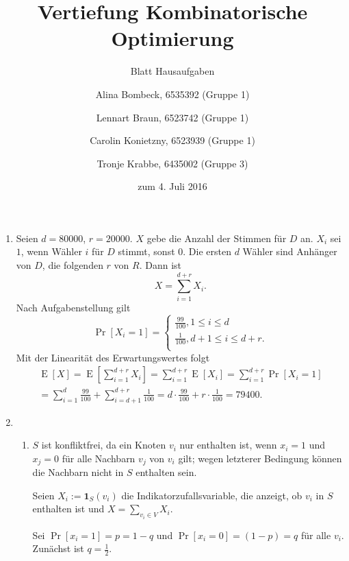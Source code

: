 \documentclass[a4paper]{scrartcl}
\title{Vertiefung Kombinatorische Optimierung}
\subtitle{Blatt {\blattnr} Hausaufgaben}
\author{%
    Alina Bombeck, 6535392 (Gruppe 1) \and
    Lennart Braun, 6523742 (Gruppe 1) \and
    Carolin Konietzny, 6523939 (Gruppe 1) \and
    Tronje Krabbe, 6435002 (Gruppe 3)
}
\date{zum 4. Juli 2016}
\DeclareMathOperator{\Pr}{Pr}
\DeclareMathOperator{\E}{E}
\begin{document}
\maketitle


\begin{enumerate}[label=\bfseries \arabic*.]
\item %
    Seien $d = \num{80000}$, $r = \num{20000}$.
    $X$ gebe die Anzahl der Stimmen für $D$ an.
    $X_i$ sei $1$, wenn Wähler $i$ für $D$ stimmt, sonst $0$.
    Die ersten $d$ Wähler sind Anhänger von $D$, die folgenden $r$ von $R$.
    Dann ist
    \begin{equation*}
        X = \sum_{i=1}^{d+r} X_i.
    \end{equation*}
    Nach Aufgabenstellung gilt
    \begin{equation*}
        \Pr[X_i = 1] =
        \begin{cases}
            \frac{99}{100}, 1 \leq i \leq d \\
            \frac{1}{100}, d+1 \leq i \leq d+r. \\
        \end{cases}
    \end{equation*}
    Mit der Linearität des Erwartungswertes folgt
    \begin{equation*}
        \begin{gathered}
            \E[X]
            = \E\left[ \sum_{i=1}^{d+r} X_i \right]
            = \sum_{i=1}^{d+r} \E[X_i]
            = \sum_{i=1}^{d+r} \Pr[X_i = 1] \\
            = \sum_{i=1}^{d} \frac{99}{100} + \sum_{i=d+1}^{d+r} \frac{1}{100}
            = d \cdot \frac{99}{100} + r \cdot \frac{1}{100}
            = \num{79400}.
        \end{gathered}
    \end{equation*}


\item %
\begin{enumerate}
    \item
        $S$ ist konfliktfrei, da ein Knoten $v_i$ nur enthalten ist, wenn
        $x_i = 1$ und $x_j = 0$ für alle Nachbarn $v_j$ von $v_i$ gilt; wegen
        letzterer Bedingung können die Nachbarn nicht in $S$ enthalten sein.

        Seien $X_i := \mathbf{1}_S(v_i)$ die Indikatorzufallsvariable, die
        anzeigt, ob $v_i$ in $S$ enthalten ist und $X = \sum_{v_i \in V} X_i$.

        Sei $\Pr[x_i = 1] = p = 1-q$ und $\Pr[x_i = 0] = (1-p) = q$ für alle
        $v_i$.
        Zunächst ist $q = \frac{1}{2}$.


\end{enumerate}
\end{enumerate}
\end{document}
